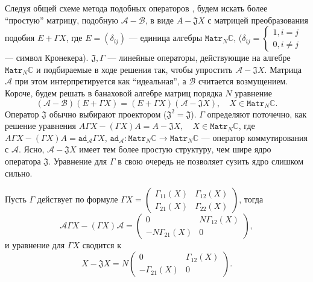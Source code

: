 Следуя общей схеме метода подобных операторов \cite{baskakov-split},
будем искать более ``простую'' матрицу, подобную \( \mathcal{A} - \mathcal{B} \),
в виде \( A - \mathfrak{J} X \)
с матрицей преобразования подобия \( E + \Gamma X \),
где \( E = (\delta_{ij}) \) --- единица алгебры \( \mathtt{Matr}_N\mathbb{C} \),
      (\( \delta_{ij} = \left\{\begin{aligned} 1, i=j \\ 0, i\neq j \end{aligned} \right. \)
          --- символ Кронекера).
\( \mathfrak{J},\Gamma \) --- линейные операторы,
действующие на алгебре \( \mathtt{Matr}_N\mathbb{C} \) и подбираемые
в ходе решения так, чтобы упростить \( \mathcal{A} - \mathfrak{J}X \).
Матрица \( \mathcal{A} \) при этом интерпретируется как ``идеальная'',
а \( \mathcal{B} \) считается возмущением.
Короче, будем решать в банаховой алгебре матриц порядка \( N \) уравнение
\begin{equation}\label{kozlukovsv:eq:similarity}
    (\mathcal{A-B})(E+\Gamma X) = (E+\Gamma X)(\mathcal{A} - \mathfrak{J} X), \quad X\in\mathtt{Matr}_N\mathbb{C}.
    \end{equation}
Оператор \( \mathfrak{J} \) обычно выбирают проектором (\(\mathfrak{J}^2=\mathfrak{J}\)).
\( \Gamma \) определяют поточечно, как решение уравнения
\( A\Gamma X - (\Gamma X) A = A - \mathfrak{J} X, \quad X\in\mathtt{Matr}_N\mathbb{C} \),
где \( A\Gamma X - (\Gamma X) A = \mathtt{ad}_{\mathcal{A}} \Gamma X \),
\(  \mathtt{ad}_{\mathcal{A}}: \mathtt{Matr}_N\mathbb{C}\to\mathtt{Matr}_N\mathbb{C} \)
--- оператор коммутирования с \( \mathcal{A} \).
Ясно, \( \mathcal{A}-\mathfrak{J}X \) имеет тем более простую структуру,
чем шире ядро оператора \( \mathfrak{J} \).
Уравнение для \( \Gamma \) в свою очередь не позволяет сузить ядро слишком сильно.

Пусть \( \Gamma \) действует по формуле
\( \Gamma X = \begin{pmatrix} \Gamma_{11}(X) & \Gamma_{12}(X) \\
                              \Gamma_{21}(X) & \Gamma_{22}(X)
                              \end{pmatrix} \), тогда
\[
    \mathcal{A} \Gamma X - (\Gamma X)\mathcal{A} = 
    \begin{pmatrix} 0 & N\Gamma_{12}(X) \\
        - N\Gamma_{21}(X) & 0
        \end{pmatrix}, \]
и уравнение для \( \Gamma X \) сводится к
\[
    X - \mathfrak{J} X =
    N \begin{pmatrix} 0 & \Gamma_{12}(X) \\
        - \Gamma_{21}(X) & 0
        \end{pmatrix}.
    \]

